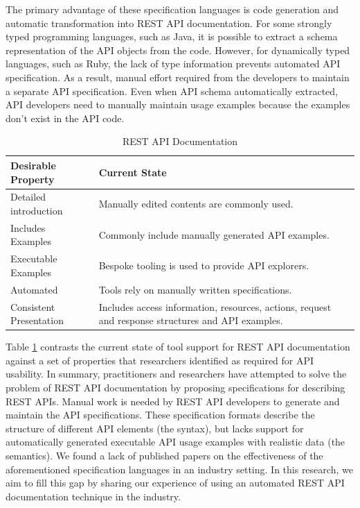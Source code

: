 The primary advantage of these specification languages is code generation and automatic transformation into REST API documentation. For some strongly typed programming languages, such as Java, it is possible to extract a schema representation of the API objects from the code. However, for dynamically typed languages, such as Ruby, the lack of type information prevents automated API specification. As a result, manual effort required from the developers to maintain a separate API specification. Even when API schema automatically extracted, API developers need to manually maintain usage examples because the examples don't exist in the API code.

\begin{table}[!tbh]
  \caption{REST API Documentation}
  \label{table:rest_apis}
\begin{tabular}{|p{2in} | p{4in}|}
\hline
\textbf{Desirable Property} & \textbf{Current State} \\
\hline
Detailed introduction &
Manually edited contents are commonly used.
 \\
\hline
Includes Examples &
Commonly include manually generated API examples.
 \\
\hline
Executable Examples &
Bespoke tooling is used to provide API explorers.
 \\
\hline
Automated &
Tools rely on manually written specifications.\\
\hline
Consistent Presentation &
Includes access information, resources, actions, request and response structures and API examples.\\
\hline
\end{tabular}
\end{table}

Table \ref{table:rest_apis} contrasts the current state of tool support for REST API documentation against a set of properties that researchers identified as required for API usability. In summary, practitioners and researchers have attempted to solve the problem of REST API documentation by proposing specifications for describing REST APIs. Manual work is needed by REST API developers to generate and maintain the API specifications. These specification formats describe the structure of different API elements (the syntax), but lacks support for automatically generated executable API usage examples with realistic data (the semantics). We found a lack of published papers on the effectiveness of the aforementioned specification languages in an industry setting. In this research, we aim to fill this gap by sharing our experience of using an automated REST API documentation technique in the industry.

